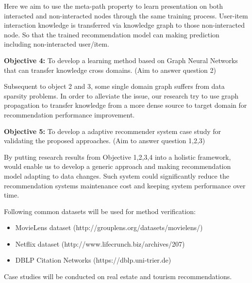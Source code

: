 Here we aim to use the meta-path property to learn presentation on both interacted and non-interacted nodes through the same training process. User-item interaction knowledge is transferred via knowledge graph to those non-interacted node. So that the trained recommendation model can making prediction including non-interacted user/item.

\bigskip
\textbf{Objective 4:} To develop a learning method based on Graph Neural Networks that can transfer knowledge cross domains. (Aim to answer question 2)

Subsequent to object 2 and 3, some single domain graph suffers from data sparsity problems. In order to alleviate the issue,
our research try to use graph propagation to transfer knowledge from a more dense source to target domain for recommendation performance improvement.




\bigskip
\textbf{Objective 5:} To develop a adaptive recommender system case study for validating the proposed approaches. (Aim to answer question 1,2,3)

By putting research results from Objective 1,2,3,4 into a holistic framework, would enable us to develop a generic approach and making recommendation model adapting to data changes. Such system could significantly reduce the recommendation systems maintenance cost and keeping system performance over time. 

Following common datasets will be used for method verification: 

\begin{itemize}

\item MovieLens dataset (http://grouplens.org/datasets/movielens/) 

\item Netflix dataset (http://www.lifecrunch.biz/archives/207) 

\item DBLP Citation Networks (https://dblp.uni-trier.de)  

\end{itemize}

Case studies will be conducted on real estate and tourism recommendations.
